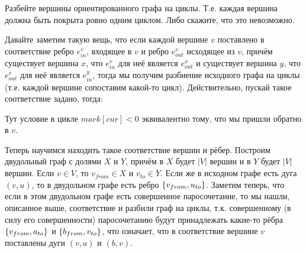 \begin{task}[4]
Разбейте вершины ориентированного графа на циклы. Т.е. каждая вершина должна быть покрыта ровно одним циклом. Либо скажите, что это невозможно.
\end{task}
\begin{solution}
Давайте заметим такую вещь, что если каждой вершине $v$ поставлено в соответствие ребро $e_{in}^v$, входящее в $v$ и ребро $e_{out}^v$ исходящее из $v$, причём существует вершина $x$, что $e_{in}^v$ для неё является $e_{out}^x$ и существует вершина $y$, что $e_{out}^v$ для неё является $e_{in}^y$, тогда мы получим разбиение исходного графа на циклы (т.е. каждой вершине сопоставим какой-то цикл). Действительно, пускай такое соответствие задано, тогда:
\begin{algorithmic}
	\EndIf
	\EndWhile
\EndFor
\end{algorithmic}
Тут условие в цикле $mark[cur]<0$ эквивалентно тому, что мы пришли обратно в $v$.

Теперь научимся находить такое соответствие вершин и рёбер. Построим двудольный граф с долями $X$ и $Y$, причём в $X$ будет $|V|$ вершин и в $Y$ будет $|V|$ вершин. Если $v \in V$, то $v_{from} \in X$ и $v_{to} \in Y$. Если же в исходном графе есть дуга $(v, u)$, то в двудольном графе есть ребро $\left\lbrace v_{from}, u_{to} \right\rbrace$. Заметим теперь, что если в этом двудольном графе есть совершенное паросочетание, то мы нашли, описанное выше, соответствие и разбили граф на циклы, т.к. совершенному (в силу его совершенности) паросочетанию будут принадлежать какие-то рёбра $\left\lbrace v_{from}, a_{to} \right\rbrace$ и $\left\lbrace b_{from}, v_{to} \right\rbrace$, что означает, что в соответствие вершине $v$ поставлены дуги $(v, a)$ и $(b, v)$.
\xqed 
\end{solution}

